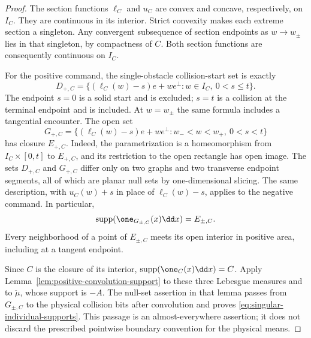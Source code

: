 \begin{proof}
The section functions $\ell_C$ and $u_C$ are convex and concave,
respectively, on $I_C$.  They are continuous in its interior.
Strict convexity makes each extreme section a singleton.  Any
convergent subsequence of section endpoints as $w\to w_\pm$
lies in that singleton, by compactness of $C$.  Both section
functions are consequently continuous on $I_C$.

For the positive command, the single-obstacle collision-start set
is exactly
\[
 D_{+,C}=\{(\ell_C(w)-s)e+we^\perp:
                         w\in I_C,\ 0<s\le t\}.
\]
The endpoint $s=0$ is a solid start and is excluded; $s=t$ is
a collision at the terminal endpoint and is included.  At
$w=w_\pm$ the same formula includes a tangential encounter.
The open set
\[
 G_{+,C}=\{(\ell_C(w)-s)e+we^\perp:
                    w_-<w<w_+,\ 0<s<t\}
\]
has closure $E_{+,C}$.  Indeed, the parametrization is a
homeomorphism from $I_C\times[0,t]$ to $E_{+,C}$, and its
restriction to the open rectangle has open image.  The sets
$D_{+,C}$ and $G_{+,C}$ differ only on two graphs and two
transverse endpoint segments, all of which are planar null sets
by one-dimensional slicing.  The same description, with
$u_C(w)+s$ in place of $\ell_C(w)-s$, applies to the negative
command.  In particular,
\[
 \operatorname{supp}(\one_{G_{\pm,C}}(x)\dd x)=E_{\pm,C}.
\]
Every neighborhood of a point of $E_{\pm,C}$ meets its open
interior in positive area, including at a tangent endpoint.

Since $C$ is the closure of its interior,
$\operatorname{supp}(\one_C(x)\dd x)=C$.  Apply
Lemma~\ref{lem:positive-convolution-support} to these three
Lebesgue measures and to $\check\mu$, whose support is $-A$.
The null-set assertion in that lemma passes from $G_{\pm,C}$
to the physical collision bits after convolution and proves
\eqref{eq:singular-individual-supports}.  This passage is an
almost-everywhere assertion; it does not discard the prescribed
pointwise boundary convention for the physical means.


\end{proof}
